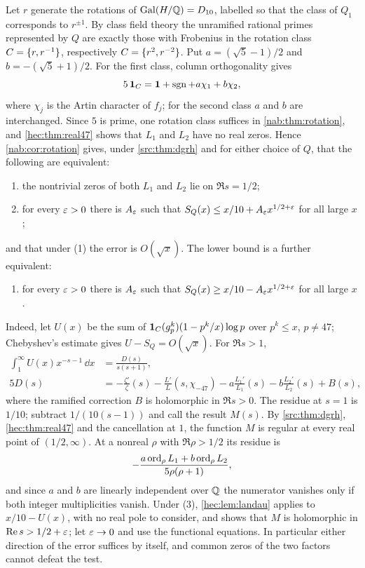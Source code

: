 \begin{remark}\label{hec:thm:primes47}
Let $r$ generate the rotations of $\operatorname{Gal}(H/\mathbb{Q})=D_{10}$, labelled so that the class of $Q_1$ corresponds to
$r^{\pm1}$. By class field theory the unramified rational primes represented by $Q$ are exactly those with
Frobenius in the rotation class $C=\{r,r^{-1}\}$, respectively $C=\{r^2,r^{-2}\}$. Put
$a=(\sqrt5-1)/2$ and $b=-(\sqrt5+1)/2$. For the first class, column orthogonality gives
\[
 5\,\mathbf{1}_C=\mathbf{1}+\operatorname{sgn}+a\chi_1+b\chi_2,
\]
where $\chi_j$ is the Artin character of $f_j$; for the second class $a$ and $b$ are interchanged. Since
$5$ is prime, one rotation class suffices in \cref{nab:thm:rotation}, and \cref{hec:thm:real47} shows that
$L_1$ and $L_2$ have no real zeros. Hence \cref{nab:cor:rotation} gives, under \cref{src:thm:dgrh} and for
either choice of $Q$, that the following are equivalent:
\begin{enumerate}[label=\textup{(\arabic*)}]
\item the nontrivial zeros of both $L_1$ and $L_2$ lie on $\Re s=1/2$;
\item for every $\varepsilon>0$ there is $A_\varepsilon$ such that $S_Q(x)\le x/10+A_\varepsilon x^{1/2+\varepsilon}$ for all large
$x$;
\end{enumerate}
and that under (1) the error is $O(\sqrt x)$. The lower bound is a further equivalent:
\begin{enumerate}[label=\textup{(\arabic*)},resume]
\item for every $\varepsilon>0$ there is $A_\varepsilon$ such that $S_Q(x)\ge x/10-A_\varepsilon x^{1/2+\varepsilon}$ for all large
$x$.
\end{enumerate}
Indeed, let $U(x)$ be the sum of $\mathbf{1}_C(g_p^k)(1-p^k/x)\log p$ over $p^k\le x$, $p\ne47$; Chebyshev's
estimate gives $U-S_Q=O(\sqrt x)$. For $\Re s>1$,
\begin{align*}
 \int_1^\infty U(x)x^{-s-1}\,\dd x&=\frac{D(s)}{s(s+1)},\\
 5D(s)&=-\frac{\zeta'}\zeta(s)-\frac{L'}L(s,\chi_{-47})-a\frac{L_1'}{L_1}(s)-b\frac{L_2'}{L_2}(s)+B(s),
\end{align*}
where the ramified correction $B$ is holomorphic in $\Re s>0$. The residue at $s=1$ is $1/10$; subtract
$1/(10(s-1))$ and call the result $M(s)$. By \cref{src:thm:dgrh}, \cref{hec:thm:real47} and the
cancellation at $1$, the function $M$ is regular at every real point of $(1/2,\infty)$. At a nonreal
$\rho$ with $\Re\rho>1/2$ its residue is
\[
 -\frac{a\operatorname{ord}_\rho L_1+b\operatorname{ord}_\rho L_2}{5\rho(\rho+1)},
\]
and since $a$ and $b$ are linearly independent over $\mathbb{Q}$ the numerator vanishes only if both integer
multiplicities vanish. Under (3), \cref{hec:lem:landau} applies to $x/10-U(x)$, with no real pole to
consider, and shows that $M$ is holomorphic in $\operatorname{Re} s>1/2+\varepsilon$; let $\varepsilon\to0$ and use the functional
equations. In particular either direction of the error suffices by itself, and common zeros of the two
factors cannot defeat the test.
\end{remark}

